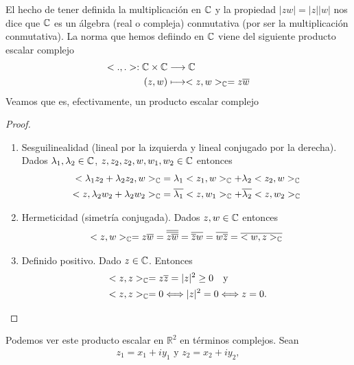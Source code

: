 El hecho de tener definida la multiplicación en $\mathbb{C}$ y la propiedad $|zw| = |z||w|$ nos dice que $\mathbb{C}$ es un álgebra (real o compleja) conmutativa (por ser la multiplicación conmutativa). La norma que hemos defiindo en $\mathbb{C}$ viene del siguiente producto escalar complejo
\begin{align*}
    <.,.> : \mathbb{C} \times \mathbb{C} & \longrightarrow \mathbb{C}                     \\
    (z,w)                    & \longmapsto <z,w>_{\mathbb{C}} = z\overline{w}
\end{align*}
Veamos que es, efectivamente, un producto escalar complejo
\begin{proof}
    \begin{enumerate}
        \item Sesguilinealidad (lineal por la izquierda y lineal conjugado por la derecha). Dados $\lambda_1, \lambda_2 \in \mathbb{C}$, $z,z_2,z_2,w,w_1,w_2 \in \mathbb{C}$ entonces
              \begin{align*}
                  <\lambda_1z_2 + \lambda_2z_2,w>_{\mathbb{C}} & = \lambda_1<z_1,w>_{\mathbb{C}} + \lambda_2<z_2,w>_{\mathbb{C}}                       \\
                  <z,\lambda_2w_2 + \lambda_2w_2>_{\mathbb{C}} & = \overline{\lambda_1}<z,w_1>_{\mathbb{C}} + \overline{\lambda_2}<z,w_2>_{\mathbb{C}}
              \end{align*}
        \item Hermeticidad (simetría conjugada). Dados $z,w \in \mathbb{C}$ entonces
              \begin{align*}
                  <z,w>_{\mathbb{C}} = z\overline{w} = \overline{\overline{z\overline{w}}} = \overline{\overline{z}w} = \overline{w\overline{z}} = \overline{<w,z>_{\mathbb{C}}}
              \end{align*}
        \item Definido positivo. Dado $z \in \mathbb{C}$. Entonces
              \begin{align*}
                   & <z,z>_{\mathbb{C}} = z\overline{z} = |z|^2 \ge 0 \ \ \ \text{y}                 \\
                   & <z,z>_{\mathbb{C}} = 0 \Longleftrightarrow |z|^2 = 0 \Longleftrightarrow z = 0.
              \end{align*}
    \end{enumerate}
\end{proof}
Podemos ver este producto escalar en $\mathbb{R}^2$ en términos complejos. Sean
\begin{align*}
    z_1 = x_1 + iy_1 \text{ \ \ \ y \ \ \ } z_2 = x_2 + iy_2,
\end{align*}
